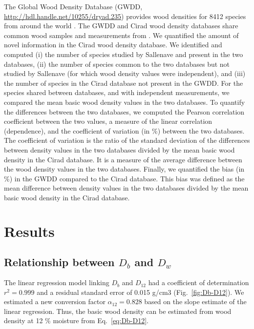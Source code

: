 \documentclass[a4paper, 12pt, leqno, dvipsnames]{article}\usepackage[]{graphicx}\usepackage[]{color}
\begin{document}
The Global Wood Density Database (GWDD, \url{http://hdl.handle.net/10255/dryad.235}) provides wood densities for 8412 species from around the world \citep{Chave2009, Zanne2009}. The GWDD and Cirad wood density databases share common wood samples and measurements from \citet{Sallenave1955, Sallenave1964, Sallenave1971}. We quantified the amount of novel information in the Cirad wood density database. We identified and computed (i) the number of species studied by Sallenave and present in the two databases, (ii) the number of species common to the two databases but not studied by Sallenave (for which wood density values were independent), and (iii) the number of species in the Cirad database not present in the GWDD. For the species shared between databases, and with independent measurements, we compared the mean basic wood density values in the two databases. To quantify the differences between the two databases, we computed the Pearson correlation coefficient between the two values, a measure of the linear correlation (dependence), and the coefficient of variation (in \%) between the two databases. The coefficient of variation is the ratio of the standard deviation of the differences between density values in the two databases divided by the mean basic wood density in the Cirad database. It is a measure of the average difference between the wood density values in the two databases. Finally, we quantified the bias (in \%) in the GWDD compared to the Cirad database. This bias was defined as the mean difference between density values in the two databases divided by the mean basic wood density in the Cirad database. 

\newpage

\section{Results}

\subsection{Relationship between $D_b$ and $D_w$}

The linear regression model linking $D_b$ and $D_{12}$ had a coefficient of determination $r^2=0.999$ and a residual standard error of 0.015 g/cm$3$ (Fig.~\ref{fig:Db-D12}). We estimated a new conversion factor $\alpha_{12}=0.828$ based on the slope estimate of the linear regression. Thus, the basic wood density can be estimated from wood density at 12 \% moisture from Eq.~\ref{eq:Db-D12}.
\end{document}
